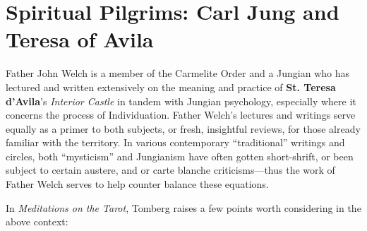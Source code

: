\section{Spiritual Pilgrims: Carl Jung and Teresa of Avila}

Father John Welch is a member of the Carmelite Order and a Jungian who has lectured and written extensively on the meaning and practice of \textbf{St. Teresa d'Avila}'s \emph{Interior Castle} in tandem with Jungian psychology, especially where it concerns the process of Individuation. Father Welch's lectures and writings serve equally as a primer to both subjects, or fresh, insightful reviews, for those already familiar with the territory. In various contemporary ``traditional'' writings and circles, both ``mysticism'' and Jungianism have often gotten short-shrift, or been subject to certain austere, and or carte blanche criticisms---thus the work of Father Welch serves to help counter balance these equations.

In \emph{Meditations on the Tarot}, Tomberg raises a few points worth considering in the above context:


